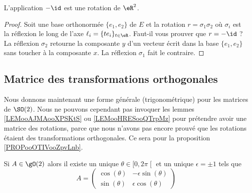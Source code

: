 \begin{lemma}       \label{LEMooMIJXooCjiQqP}
    L'application \( -\id\) est une rotation de \( \eR^2\).
\end{lemma}

\begin{proof}
    Soit une base orthonormée \( \{ e_1,e_2 \}\) de \( E\) et la rotation \( r=\sigma_1\sigma_2\) où \( \sigma_i\) est la réflexion le long de l'axe \( \ell_i=\{ te_i \}_{t\in \eR}\). Faut-il vous prouver que \( r=-\id\) ? La réflexion \( \sigma_2\) retourne la composante \( y\) d'un vecteur écrit dans la base \( \{ e_1,e_2 \}\) sans toucher à la composante \( x\). La réflexion \( \sigma_1\) fait le contraire.
\end{proof}

\subsection{Matrice des transformations orthogonales}

Nous donnons maintenant une forme générale (trigonométrique) pour les matrices de \( \SO(2)\). Nous ne pouvons cependant pas invoquer les lemmes \ref{LEMooAJMAooXPSKtS} ou \ref{LEMooHRESooQTrpMz} pour prétendre avoir une matrice des rotations, parce que nous n'avons pas encore prouvé que les rotations étaient des transformations orthogonales. Ce sera pour la proposition \ref{PROPooOTIVooZpvLnb}.

\begin{lemma}       \label{LEMooAJMAooXPSKtS}
    Si \( A\in \gO(2)\) alors il existe un unique \( \theta\in\mathopen[ 0 , 2\pi \mathclose[\) et un unique \( \epsilon=\pm 1\) tels que
    \begin{equation}
        A=\begin{pmatrix}
            \cos(\theta)    &   -\epsilon\sin(\theta)    \\
            \sin(\theta)    &   \epsilon\cos(\theta)
        \end{pmatrix}
    \end{equation}
\end{lemma}

